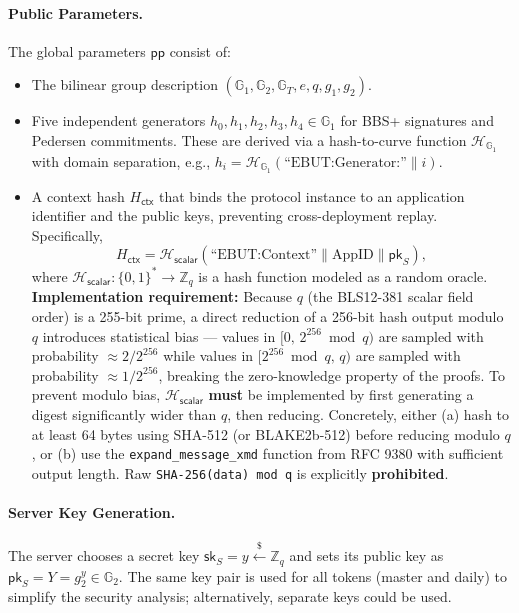 \documentclass[11pt]{article}
\theoremstyle{definitionstyle}
\theoremstyle{plain}
\begin{document}
\paragraph{Public Parameters.}
The global parameters $\mathsf{pp}$ consist of:
\begin{itemize}
\item The bilinear group description $(\mathbb{G}_1,\mathbb{G}_2,\mathbb{G}_T,e,q,g_1,g_2)$.
\item Five independent generators $h_0, h_1, h_2, h_3, h_4 \in \mathbb{G}_1$ for BBS+ signatures and Pedersen commitments. These are derived via a hash-to-curve function $\mathcal{H}_{\mathbb{G}_1}$ with domain separation, e.g., $h_i = \mathcal{H}_{\mathbb{G}_1}(\text{``EBUT:Generator:''} \parallel i)$.
\item A context hash $H_{\mathsf{ctx}}$ that binds the protocol instance to an application identifier and the public keys, preventing cross-deployment replay. Specifically,
  \[
  H_{\mathsf{ctx}} = \mathcal{H}_{\mathsf{scalar}}(\text{``EBUT:Context''} \parallel \text{AppID} \parallel \mathsf{pk}_S),
  \]
  where $\mathcal{H}_{\mathsf{scalar}}: \{0,1\}^* \to \mathbb{Z}_q$ is a hash function modeled as a random oracle. \textbf{Implementation requirement:} Because $q$ (the BLS12-381 scalar field order) is a 255-bit prime, a direct reduction of a 256-bit hash output modulo $q$ introduces statistical bias — values in $[0,\, 2^{256} \bmod q)$ are sampled with probability ${\approx}2/2^{256}$ while values in $[2^{256} \bmod q,\, q)$ are sampled with probability ${\approx}1/2^{256}$, breaking the zero-knowledge property of the proofs. To prevent modulo bias, $\mathcal{H}_{\mathsf{scalar}}$ \textbf{must} be implemented by first generating a digest significantly wider than $q$, then reducing. Concretely, either (a) hash to at least 64 bytes using SHA-512 (or BLAKE2b-512) before reducing modulo $q$, or (b) use the \texttt{expand\_message\_xmd} function from RFC 9380 with sufficient output length. Raw \texttt{SHA-256(data) mod q} is explicitly \textbf{prohibited}.
\end{itemize}

\paragraph{Server Key Generation.}
The server chooses a secret key $\mathsf{sk}_S = y \xleftarrow{\$} \mathbb{Z}_q$ and sets its public key as $\mathsf{pk}_S = Y = g_2^y \in \mathbb{G}_2$. The same key pair is used for all tokens (master and daily) to simplify the security analysis; alternatively, separate keys could be used.
\end{document}
